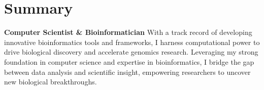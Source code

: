 \section{Summary}
    \textbf{Computer Scientist \& Bioinformatician} With a track record of developing innovative bioinformatics tools and frameworks, I harness computational power to drive biological discovery and accelerate genomics research. Leveraging my strong foundation in computer science and expertise in bioinformatics, I bridge the gap between data analysis and scientific insight, empowering researchers to uncover new biological breakthroughs.